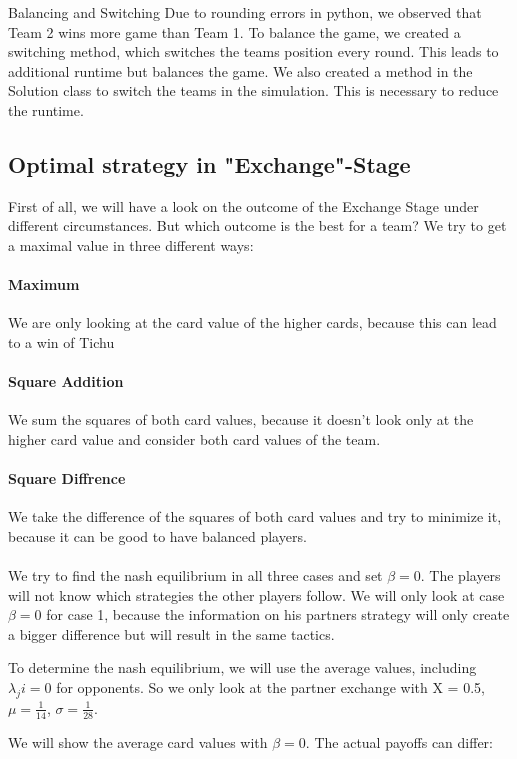 Balancing and Switching
Due to rounding errors in python, we observed that Team 2 wins more game than Team 1. 
To balance the game, we created a switching method, which switches the teams position every round. This leads to additional runtime but balances the game. 
We also created a method in the Solution class to switch the teams in the simulation. This is necessary to reduce the runtime. 

\subsection{Optimal strategy in "Exchange"-Stage}

First of all, we will have a look on the outcome of the Exchange Stage under different circumstances. But which outcome is the best for a team? We try to get a maximal value in three different ways:

\paragraph{Maximum}  We are only looking at the card value of the higher cards, because this can lead to a win of Tichu
\paragraph{Square Addition}  We sum the squares of both card values, because it doesn’t look only at the higher card value and consider both card values of the team.
\paragraph{Square Diffrence} We take the difference of the squares of both card values and try to minimize it, because it can be good to have balanced players. 
\\
\\
We try to find the nash equilibrium in all three cases and set $\beta = 0$. The players will not know which strategies the other players follow. We will only look at case $\beta = 0$ for case 1, because the information on his partners strategy will only create a bigger difference but will result in the same tactics. 

To determine the nash equilibrium, we will use the average values, including $\lambda_ji = 0$ for opponents. So we only look at the partner exchange with X = 0.5, $\mu = \frac{1}{14}$, $\sigma = \frac{1}{28}$.

We will show the average card values with $\beta =0$. The actual payoffs can differ:
\begin{table}[h]
\end{table}


